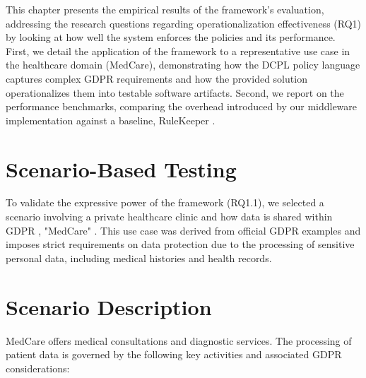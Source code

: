 

This chapter presents the empirical results of the framework's evaluation, addressing the research questions regarding operationalization effectiveness (RQ1) by looking at how well the system enforces the policies and its performance. First, we detail the application of the framework to a representative use case in the healthcare domain (MedCare), demonstrating how the DCPL policy language captures complex GDPR requirements and how the provided solution operationalizes them into testable software artifacts. Second, we report on the performance benchmarks, comparing the overhead introduced by our middleware implementation against a baseline, RuleKeeper \cite{ferreira2023rulekeeper}.

\section{Scenario-Based Testing}

To validate the expressive power of the framework (RQ1.1), we selected a scenario involving a private healthcare clinic and how data is shared within GDPR \cite{GDPR2016a}, "MedCare" \cite{CharityGDPR}. This use case was derived from official GDPR examples \cite{GDPRExample} and imposes strict requirements on data protection due to the processing of sensitive personal data, including medical histories and health records.

\section*{Scenario Description}

MedCare offers medical consultations and diagnostic services. The processing of patient data is governed by the following key activities and associated GDPR considerations:

